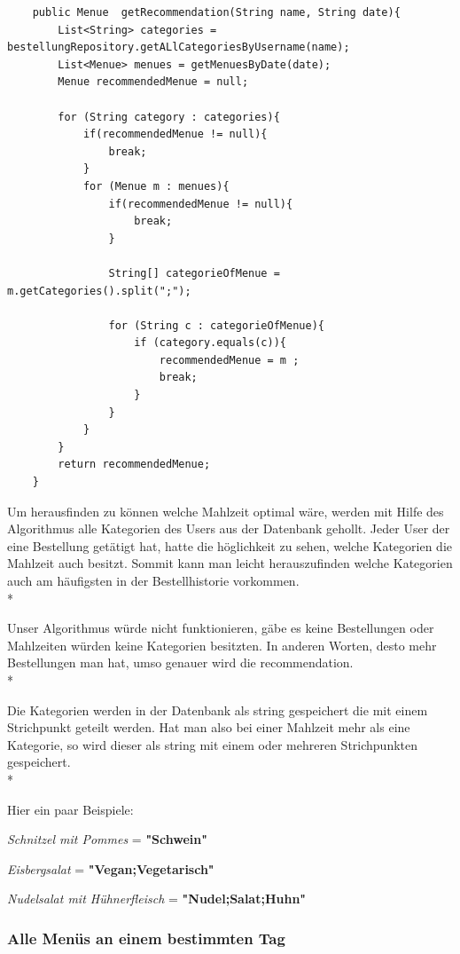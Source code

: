 \begin{lstlisting}
    public Menue  getRecommendation(String name, String date){
        List<String> categories = bestellungRepository.getALlCategoriesByUsername(name);
        List<Menue> menues = getMenuesByDate(date);
        Menue recommendedMenue = null;

        for (String category : categories){
            if(recommendedMenue != null){
                break;
            }
            for (Menue m : menues){
                if(recommendedMenue != null){
                    break;
                }

                String[] categorieOfMenue = m.getCategories().split(";");

                for (String c : categorieOfMenue){
                    if (category.equals(c)){
                        recommendedMenue = m ;
                        break;
                    }
                }
            }
        }
        return recommendedMenue;
    }
\end{lstlisting}

Um herausfinden zu können welche Mahlzeit optimal wäre, werden mit Hilfe des Algorithmus alle Kategorien des Users aus der Datenbank gehollt. 
Jeder User der eine Bestellung getätigt hat, hatte die höglichkeit zu sehen, welche Kategorien die Mahlzeit auch besitzt. Sommit kann man leicht herauszufinden
welche Kategorien auch am häufigsten in der Bestellhistorie vorkommen. \\*

Unser Algorithmus würde nicht funktionieren, gäbe es keine Bestellungen oder Mahlzeiten würden keine Kategorien besitzten. 
In anderen Worten, desto mehr Bestellungen man hat, umso genauer wird die recommendation. \\*

Die Kategorien werden in der Datenbank als string gespeichert die mit einem Strichpunkt geteilt werden. Hat man also bei einer Mahlzeit mehr als eine Kategorie,
so wird dieser als string mit einem oder mehreren Strichpunkten gespeichert. \\*

Hier ein paar Beispiele:

\textit{Schnitzel mit Pommes} = \textbf{"Schwein"}

\textit{Eisbergsalat} = \textbf{"Vegan;Vegetarisch"}

\textit{Nudelsalat mit Hühnerfleisch} = \textbf{"Nudel;Salat;Huhn"}

\subsubsection{Alle Menüs an einem bestimmten Tag}

